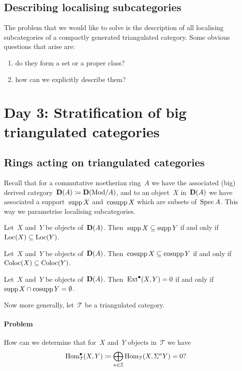 \documentclass[10pt,a4paper]{article}
\begin{document}
\subsection{Describing localising subcategories}
The problem that we would like to solve is the description of all localising subcategories of a compactly generated triangulated category. Some obvious questions that arise are:
\begin{enumerate}
  \item do they form a set or a proper class?
  \item how can we explicitly describe them?
\end{enumerate}



\section{Day 3: Stratification of big triangulated categories}
\subsection{Rings acting on triangulated categories}
Recall that for a commutative noetherian ring~$A$ we have the associated (big) derived category~$\mathbf{D}(A)\coloneqq\mathbf{D}(\mathrm{Mod}/A)$, and to an object~$X$ in~$\mathbf{D}(A)$ we have associated a support~$\operatorname{supp} X$ and~$\operatorname{cosupp} X$ which are subsets of~$\operatorname{Spec} A$. This way we parametrise localising subcategories.
\begin{lemma}
  Let~$X$ and~$Y$ be objects of~$\mathbf{D}(A)$. Then~$\operatorname{supp} X\subseteq \operatorname{supp} Y$ if and only if~$\operatorname{Loc}(X)\subseteq\operatorname{Loc}(Y)$.
\end{lemma}

\begin{lemma}
  Let~$X$ and~$Y$ be objects of~$\mathbf{D}(A)$. Then~$\operatorname{cosupp} X\subseteq \operatorname{cosupp} Y$ if and only if~$\operatorname{Coloc}(X)\subseteq\operatorname{Coloc}(Y)$.
\end{lemma}

\begin{corollary}
  Let~$X$ and~$Y$ be objects of~$\mathbf{D}(A)$. Then~$\operatorname{Ext}^\bullet(X,Y)=0$ if and only if~$\operatorname{supp} X\cap\operatorname{cosupp} Y=\emptyset$.
\end{corollary}

Now more generally, let~$\mathcal{T}$ be a triangulated category.
\paragraph{Problem} How can we determine that for~$X$ and~$Y$ objects in~$\mathcal{T}$ we have
\begin{equation}
  \operatorname{Hom}_{\mathcal{T}}^\bullet(X,Y)\coloneqq\bigoplus_{n\in\mathbb{Z}}\operatorname{Hom}_{\mathcal{T}}(X,\Sigma^nY)=0?
\end{equation}
\end{document}
